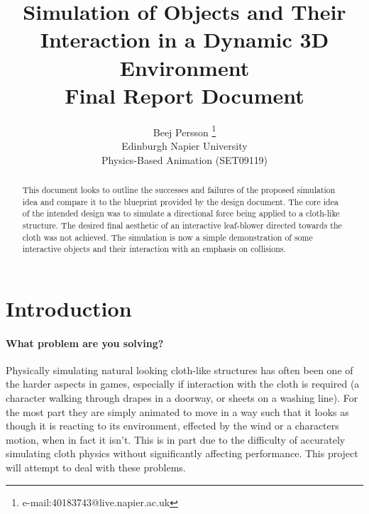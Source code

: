 \documentclass[conference,backref=page]{acmsiggraph}
\title{Simulation of Objects and Their Interaction in a Dynamic 3D Environment\\
	   Final Report Document}
\author{Beej Persson \thanks{e-mail:40183743@live.napier.ac.uk} \\
Edinburgh Napier University\\
Physics-Based Animation (SET09119)}
\begin{document}

\maketitle

\raggedbottom

\begin{abstract}

This document looks to outline the successes and failures of the proposed simulation idea and compare it to the blueprint provided by the design document. The core idea of the intended design was to simulate a directional force being applied to a cloth-like structure. The desired final aesthetic of an interactive leaf-blower directed towards the cloth was not achieved. The simulation is now a simple demonstration of some interactive objects and their interaction with an emphasis on collisions.

\end{abstract}



\keywordlist





\section{Introduction}



\paragraph{What problem are you solving?}
Physically simulating natural looking cloth-like structures has often been one of the harder aspects in games, especially if interaction with the cloth is required (a character walking through drapes in a doorway, or sheets on a washing line). For the most part they are simply animated to move in a way such that it looks as though it is reacting to its environment, effected by the wind or a characters motion, when in fact it isn't. This is in part due to the difficulty of accurately simulating cloth physics without significantly affecting performance. This project will attempt to deal with these problems.
\end{document}
